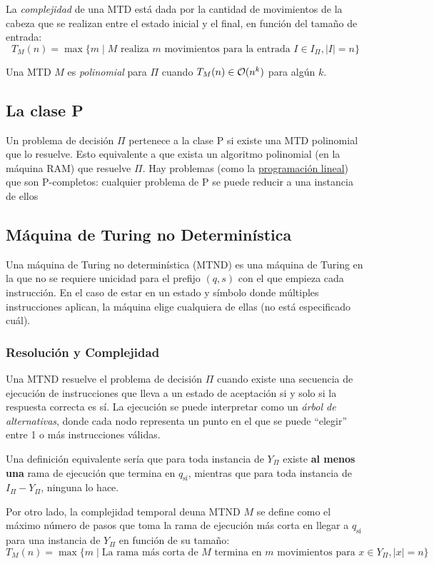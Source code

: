 La \textit{complejidad} de una MTD está dada por la cantidad de movimientos de la cabeza que se realizan entre el estado inicial y el final, en función del tamaño de entrada:
$$T_M(n) = \max\{m \mid M \text{ realiza $m$ movimientos para la entrada $I \in I_{\Pi}, |I| = n$}\}$$

Una MTD $M$ es \textit{polinomial} para $\Pi$ cuando $T_M(n) \in \mathcal{O}(n^k)$ para algún $k$.

\subsection{La clase P}

Un problema de decisión $\Pi$ pertenece a la clase P si existe una MTD polinomial que lo resuelve. Esto equivalente a que exista un algoritmo polinomial (en la máquina RAM) que resuelve $\Pi$. Hay problemas (como la \hyperref[programacion-lineal]{programación lineal}) que son P-completos: cualquier problema de P se puede reducir a una instancia de ellos

\subsection{Máquina de Turing no Determinística}

Una máquina de Turing no determinística (MTND) es una máquina de Turing en la que no se requiere unicidad para el prefijo $(q, s)$ con el que empieza cada instrucción. En el caso de estar en un estado y símbolo donde múltiples instrucciones aplican, la máquina elige cualquiera de ellas (no está especificado cuál).

\subsubsection{Resolución y Complejidad}

Una MTND resuelve el problema de decisión $\Pi$ cuando existe una secuencia de ejecución de instrucciones que lleva a un estado de aceptación si y solo si la respuesta correcta es sí. La ejecución se puede interpretar como un \textit{árbol de alternativas}, donde cada nodo representa un punto en el que se puede ``elegir'' entre 1 o más instrucciones válidas.

Una definición equivalente sería que para toda instancia de $Y_{\Pi}$ existe \textbf{al menos una} rama de ejecución que termina en $q_{\text{sí}}$, mientras que para toda instancia de $I_{\Pi} - Y_{\Pi}$, ninguna lo hace.

Por otro lado, la complejidad temporal deuna MTND $M$ se define como el máximo número de pasos que toma la rama de ejecución más corta en llegar a $q_{\text{sí}}$ para una instancia de $Y_{\Pi}$ en función de su tamaño:
$$T_M(n) = \max\{m \mid \text{La rama más corta de $M$ termina en $m$ movimientos para $x \in Y_{\Pi}, |x| = n$}\}$$

